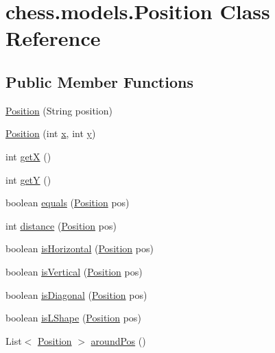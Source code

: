 \hypertarget{classchess_1_1models_1_1_position}{}\section{chess.\+models.\+Position Class Reference}
\label{classchess_1_1models_1_1_position}
\subsection*{Public Member Functions}
\begin{DoxyCompactItemize}
\item 
\mbox{\hyperlink{classchess_1_1models_1_1_position_af2ca0e2b74a18503f08e8492a52501c1}{Position}} (String position)
\item 
\mbox{\hyperlink{classchess_1_1models_1_1_position_aa5e15407a249f22ba683d43083c3f16b}{Position}} (int \mbox{\hyperlink{classchess_1_1models_1_1_position_a9b095a78776d58d10169eb9be3e6ff3e}{x}}, int \mbox{\hyperlink{classchess_1_1models_1_1_position_a9f261b4012bcedec786be011dee19fbf}{y}})
\item 
int \mbox{\hyperlink{classchess_1_1models_1_1_position_a1de14ed4ac5e2376caf3ecbf4f415e38}{getX}} ()
\item 
int \mbox{\hyperlink{classchess_1_1models_1_1_position_aa4cdabf057a4a9fac849b04dc687a8ed}{getY}} ()
\item 
boolean \mbox{\hyperlink{classchess_1_1models_1_1_position_ab66e53b6cb98e557aa0fc811e7987486}{equals}} (\mbox{\hyperlink{classchess_1_1models_1_1_position}{Position}} pos)
\item 
int \mbox{\hyperlink{classchess_1_1models_1_1_position_ad2ac6e3457056ccba6f1ccf3603f2554}{distance}} (\mbox{\hyperlink{classchess_1_1models_1_1_position}{Position}} pos)
\item 
boolean \mbox{\hyperlink{classchess_1_1models_1_1_position_a5fdc417a5c9eed00af982d202b505767}{is\+Horizontal}} (\mbox{\hyperlink{classchess_1_1models_1_1_position}{Position}} pos)
\item 
boolean \mbox{\hyperlink{classchess_1_1models_1_1_position_a50da6933e82356a80b6f012251189d25}{is\+Vertical}} (\mbox{\hyperlink{classchess_1_1models_1_1_position}{Position}} pos)
\item 
boolean \mbox{\hyperlink{classchess_1_1models_1_1_position_a359f1be865e9ba19dc94116ce1fe8214}{is\+Diagonal}} (\mbox{\hyperlink{classchess_1_1models_1_1_position}{Position}} pos)
\item 
boolean \mbox{\hyperlink{classchess_1_1models_1_1_position_a7e79c1169c4333aa98d6445af82ea5e2}{is\+L\+Shape}} (\mbox{\hyperlink{classchess_1_1models_1_1_position}{Position}} pos)
\item 
List$<$ \mbox{\hyperlink{classchess_1_1models_1_1_position}{Position}} $>$ \mbox{\hyperlink{classchess_1_1models_1_1_position_a86f1df8c1f1a5303a0bb0386c5181eef}{around\+Pos}} ()
\end{DoxyCompactItemize}
